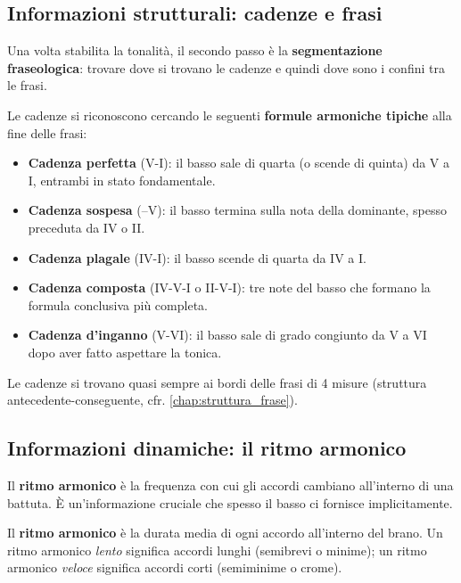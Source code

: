 \subsection{Informazioni strutturali: cadenze e frasi}

Una volta stabilita la tonalità, il secondo passo è la \textbf{segmentazione fraseologica}: trovare dove si trovano le cadenze e quindi dove sono i confini tra le frasi.

\begin{regola}
	\label{reg:riconoscimento_cadenze_basso}
	Le cadenze si riconoscono cercando le seguenti \textbf{formule armoniche tipiche} alla fine delle frasi:
	\begin{itemize}
		\item \textbf{Cadenza perfetta} (V-I): il basso sale di quarta (o scende di quinta) da V a I, entrambi in stato fondamentale.
		\item \textbf{Cadenza sospesa} (--V): il basso termina sulla nota della dominante, spesso preceduta da IV o II.
		\item \textbf{Cadenza plagale} (IV-I): il basso scende di quarta da IV a I.
		\item \textbf{Cadenza composta} (IV-V-I o II-V-I): tre note del basso che formano la formula conclusiva più completa.
		\item \textbf{Cadenza d'inganno} (V-VI): il basso sale di grado congiunto da V a VI dopo aver fatto aspettare la tonica.
	\end{itemize}
	Le cadenze si trovano quasi sempre ai bordi delle frasi di 4 misure (struttura antecedente-conseguente, cfr. \ref{chap:struttura_frase}).
\end{regola}

\subsection{Informazioni dinamiche: il ritmo armonico}

Il \textbf{ritmo armonico} è la frequenza con cui gli accordi cambiano all'interno di una battuta. È un'informazione cruciale che spesso il basso ci fornisce implicitamente.

\begin{definizione}
	\label{def:ritmo_armonico}
	Il \textbf{ritmo armonico} è la durata media di ogni accordo all'interno del brano. Un ritmo armonico \textit{lento} significa accordi lunghi (semibrevi o minime); un ritmo armonico \textit{veloce} significa accordi corti (semiminime o crome).
\end{definizione}

